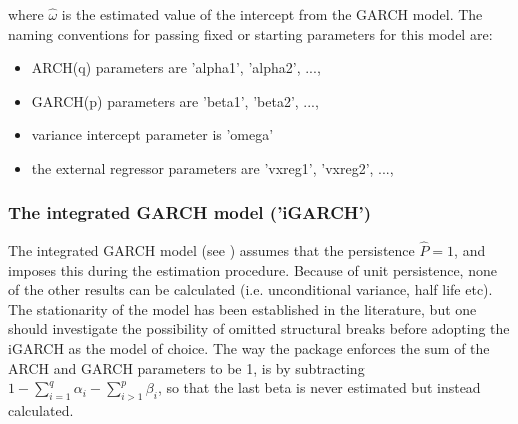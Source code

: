 where $\hat \omega$ is the estimated value of the intercept from the GARCH model.
The naming conventions for passing fixed or starting parameters for this model
are:
\begin{itemize}
\item ARCH(q) parameters are 'alpha1', 'alpha2', ...,
\item GARCH(p) parameters are 'beta1', 'beta2', ...,
\item variance intercept parameter is 'omega'
\item the external regressor parameters are 'vxreg1', 'vxreg2', ...,
\end{itemize}

\subsubsection{The integrated GARCH model ('iGARCH')}\label{section:igarch}
The integrated GARCH model (see \citet{Engle2}) assumes that the
persistence $\hat P = 1$, and imposes this during the estimation procedure.
Because of unit persistence, none of the other results can be calculated
(i.e. unconditional variance, half life etc). The stationarity of the model has
been established in the literature, but one should investigate the possibility
of omitted structural breaks before adopting the iGARCH as the model of choice.
The way the package enforces the sum of the ARCH and GARCH parameters to be 1,
is by subtracting $1 - \sum\limits_{i = 1}^q {{\alpha _i} - } \sum\limits_{i > 1}^p {{\beta _i}}$,
so that the last beta is never estimated but instead calculated.
